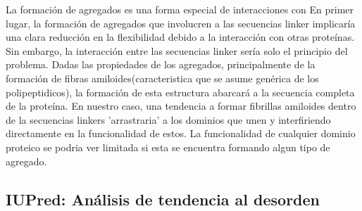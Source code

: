 La formación de agregados es una forma especial de interacciones con 
En primer lugar, la formación de agregados que involucren a las secuencias linker implicaría una clara reducción en la flexibilidad debido a la interacción con otras proteínas.
Sin embargo, la interacción entre las secuencias linker sería solo el principio del problema.
Dadas las propiedades de los agregados, principalmente de la formación de fibras amiloides(caracteristica que se asume genérica de los polipeptidicos), 
la formación de esta estructura abarcará a la secuencia completa de la proteína.
En nuestro caso, una tendencia a formar fibrillas amiloides dentro de la secuencias linkers 'arrastraria' a los dominios que unen y interfiriendo directamente en la funcionalidad de estos. 
La funcionalidad de cualquier dominio proteico se podria ver limitada si esta se encuentra formando algun tipo de agregado.























\subsection{IUPred: Análisis de tendencia al desorden} \label{iupred}


